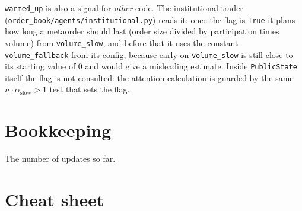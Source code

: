\documentclass[11pt,a4paper]{article}
\newcommand{\code}[1]{\texttt{#1}}
\begin{document}
\begin{whyuse}
\code{warmed\_up} is also a signal for \emph{other} code. The institutional trader
(\code{order\_book/agents/institutional.py}) reads it: once the flag is \code{True} it plans how long
a metaorder should last (order size divided by participation times volume) from \code{volume\_slow}, and before that it uses the constant \code{volume\_fallback} from its
config, because early on \code{volume\_slow} is still close to its starting value of $0$ and would give
a misleading estimate. Inside \code{PublicState} itself the flag is not consulted: the attention
calculation is guarded by the same $n\cdot\alpha_{\text{slow}}>1$ test that sets the flag.
\end{whyuse}

\section{Bookkeeping}

\begin{description}[leftmargin=3.2cm, style=nextline]
  \item[\code{step\_count}] The number of updates so far.
\end{description}

\section{Cheat sheet}
\end{document}
